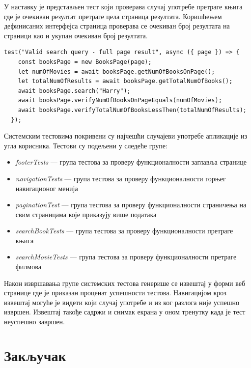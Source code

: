 \documentclass[12pt,oneside]{memoir}
\begin{document}
\newpage
У наставку је представљен тест који проверава случај употребе претраге књига где је очекиван резултат претраге цела страница резултата. Коришћењем дефинисаних интерфејса страница проверава се очекиван број резултата на страници као и укупан очекиван број резултата.


\begin{lstlisting}[caption=Тест случаја употребе --- претрага књига, 
basicstyle=\tiny,
label={lst:},
frame=single]
 test("Valid search query - full page result", async ({ page }) => {
    const booksPage = new BooksPage(page);
    let numOfMovies = await booksPage.getNumOfBooksOnPage();
    let totalNumOfResults = await booksPage.getTotalNumOfBooks();
    await booksPage.search("Harry");
    await booksPage.verifyNumOfBooksOnPageEquals(numOfMovies);
    await booksPage.verifyTotalNumOfBooksLessThen(totalNumOfResults);
  });
\end{lstlisting}

Системским тестовима покривени су најчешћи случајеви употребе апликације из угла корисника. Тестови су подељени у следеће групе:
\begin{itemize}
\item \textit{footerTests} --- група тестова за проверу функционалности заглавља странице
\item \textit{navigationTests} --- група тестова за проверу функционалности горњег навигационог менија 
\item \textit{paginationTest} --- група тестова за проверу функционалности страничења на свим страницама које приказују више података
\item \textit{searchBookTests} --- група тестова за проверу функционалности претраге књига
\item \textit{searchMovieTests} --- група тестова за проверу функционалности претраге филмова
\end{itemize}

 Након извршавања групе системских тестова генерише се извештај у форми веб странице где је приказан проценат успешности тестова. Навигацијом кроз извештај могуће је видети који случај употребе и из ког разлога није успешно извршен. Извештај такође садржи и снимак екрана у оном тренутку када је тест неуспешно завршен. 
 
 



\chapter{Закључак}
\end{document}
